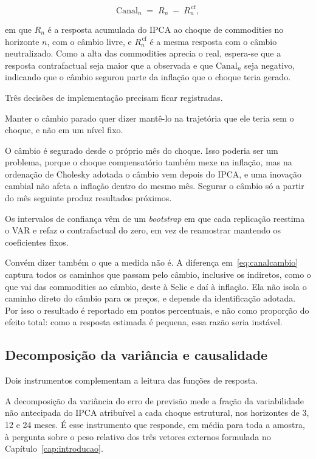 \documentclass[12pt,openright,oneside,a4paper,portuguese,brazil]{abntex2}
\begin{document}
\begin{equation}
\mathrm{Canal}_{n} \;=\; R_{n} \;-\; R^{\,\mathrm{cf}}_{n} ,
\label{eq:canalcambio}
\end{equation}

\noindent em que $R_{n}$ é a resposta acumulada do IPCA ao choque de
commodities no horizonte $n$, com o câmbio livre, e $R^{\,\mathrm{cf}}_{n}$ é
a mesma resposta com o câmbio neutralizado. Como a alta das commodities aprecia o real,
espera-se que a resposta contrafactual seja maior que a observada e que
$\mathrm{Canal}_{n}$ seja negativo, indicando que o câmbio segurou parte da
inflação que o choque teria gerado.

Três decisões de implementação precisam ficar registradas.

Manter o câmbio parado quer dizer mantê-lo na trajetória que ele teria sem o
choque, e não em um nível fixo.

O câmbio é segurado desde o próprio mês do choque. Isso poderia ser um
problema, porque o choque compensatório também mexe na inflação, mas na
ordenação de Cholesky adotada o câmbio vem depois do IPCA, e uma inovação
cambial não afeta a inflação dentro do mesmo mês. Segurar o câmbio só a partir
do mês seguinte produz resultados próximos.

Os intervalos de confiança vêm de um \textit{bootstrap} em que cada replicação
reestima o VAR e refaz o contrafactual do zero, em vez de reamostrar mantendo
os coeficientes fixos.

Convém dizer também o que a medida não é. A diferença em~\eqref{eq:canalcambio}
captura todos os caminhos que passam pelo câmbio, inclusive os indiretos, como o que vai
das commodities ao câmbio, deste à Selic e daí à inflação. Ela não isola o
caminho direto do câmbio para os preços, e depende da identificação adotada. Por
isso o resultado é reportado em pontos percentuais, e não como proporção do
efeito total: como a resposta estimada é pequena, essa razão seria instável.

\subsection{Decomposição da variância e causalidade}

Dois instrumentos complementam a leitura das funções de resposta.

A decomposição da variância do erro de previsão mede a fração da variabilidade
não antecipada do IPCA atribuível a cada choque estrutural, nos horizontes de
3, 12 e 24 meses. É esse instrumento que responde, em média para toda a
amostra, à pergunta sobre o peso relativo dos três vetores externos formulada
no Capítulo~\ref{cap:introducao}.
\end{document}
